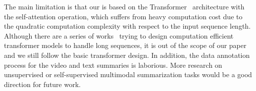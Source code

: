 The main limitation is that our \system is based on the Transformer~\cite{vaswani2017attention} architecture with the self-attention operation, which suffers from heavy computation cost due to the quadratic computation complexity with respect to the input sequence length.
Although there are a series of works~\cite{beltagy2020longformer,kitaev2020reformer,correia2019adaptively,vyas2020fast} trying to design computation efficient transformer models to handle long sequences, it is out of the scope of our paper and we still follow the basic transformer design.
In addition, the data annotation process for the video and text summaries is laborious. More research on unsupervised or self-supervised multimodal summarization tasks would be a good direction for future work.



